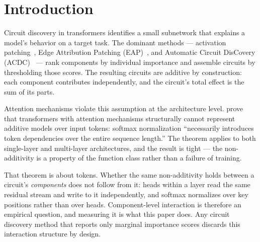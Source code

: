 \documentclass{article}
\begin{document}


%
%

\section{Introduction}
\label{sec:introduction}

Circuit discovery in transformers identifies a small subnetwork that
explains a model's behavior on a target task. The dominant methods ---
activation patching~\citep{wang2022ioi}, Edge Attribution Patching
(EAP)~\citep{syed2023attribution}, and Automatic Circuit DisCovery
(ACDC)~\citep{conmy2023acdc} --- rank components by individual
importance and assemble circuits by thresholding those scores. The
resulting circuits are additive by construction: each component
contributes independently, and the circuit's total effect is the sum of
its parts.

Attention mechanisms violate this assumption at the architecture level.
\citet{leemann2024slalom} prove that transformers with attention
mechanisms structurally cannot represent additive models over input
tokens: softmax normalization ``necessarily introduces token
dependencies over the entire sequence length.'' The theorem applies to
both single-layer and multi-layer architectures, and the result is
tight --- the non-additivity is a property of the function class rather
than a failure of training.

That theorem is about tokens. Whether the same non-additivity holds
between a circuit's \emph{components} does not follow from it: heads
within a layer read the same residual stream and write to it
independently, and softmax normalizes over key positions rather than
over heads. Component-level interaction is therefore an empirical
question, and measuring it is what this paper does. Any circuit discovery method that
reports only marginal importance scores discards this interaction
structure by design.
\end{document}
